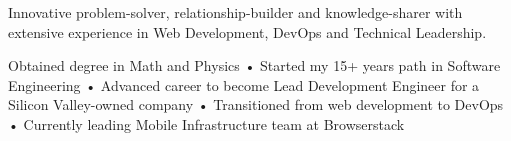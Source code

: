 

\begin{cvparagraph}

Innovative problem-solver, relationship-builder and knowledge-sharer with extensive experience in Web Development, DevOps and Technical Leadership.

Obtained degree in Math and Physics • Started my 15+ years path in Software Engineering • Advanced career to become Lead Development Engineer for a Silicon Valley-owned company • Transitioned from web development to DevOps • Currently leading Mobile Infrastructure team at Browserstack

\end{cvparagraph}
